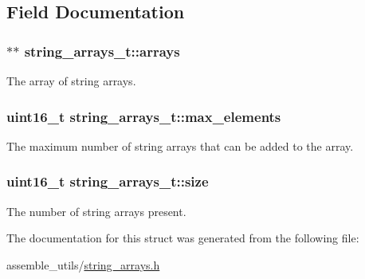 \subsection{Field Documentation}
\subsubsection[{\texorpdfstring{arrays}{arrays}}]{$\ast$$\ast$ string\+\_\+arrays\+\_\+t\+::arrays}\hypertarget{structstring__arrays__t_a6ff6c8bd382d230f4538415fbf78765e}{}\label{structstring__arrays__t_a6ff6c8bd382d230f4538415fbf78765e}
The array of string arrays. 
\subsubsection[{\texorpdfstring{max\+\_\+elements}{max_elements}}]{\setlength{\rightskip}{0pt plus 5cm}uint16\+\_\+t string\+\_\+arrays\+\_\+t\+::max\+\_\+elements}\hypertarget{structstring__arrays__t_a44302bf32cb7eede15f027da880e884e}{}\label{structstring__arrays__t_a44302bf32cb7eede15f027da880e884e}
The maximum number of string arrays that can be added to the array. 
\subsubsection[{\texorpdfstring{size}{size}}]{\setlength{\rightskip}{0pt plus 5cm}uint16\+\_\+t string\+\_\+arrays\+\_\+t\+::size}\hypertarget{structstring__arrays__t_a0df76b18c735586cd916029fd8d63d9b}{}\label{structstring__arrays__t_a0df76b18c735586cd916029fd8d63d9b}
The number of string arrays present. 

The documentation for this struct was generated from the following file\+:\begin{DoxyCompactItemize}
\item 
assemble\+\_\+utils/\hyperlink{string__arrays_8h}{string\+\_\+arrays.\+h}\end{DoxyCompactItemize}
